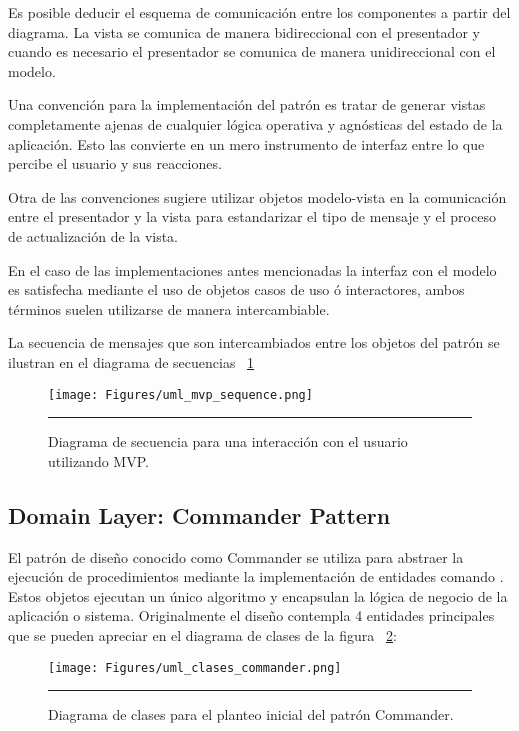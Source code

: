 Es posible deducir el esquema de comunicación entre los componentes a partir del diagrama. La vista se comunica de manera bidireccional con el presentador y cuando es necesario el presentador se comunica de manera unidireccional con el modelo.


Una convención para la implementación del patrón es tratar de generar vistas completamente ajenas de cualquier lógica operativa y agnósticas del estado de la aplicación. Esto las convierte en un mero instrumento de interfaz entre lo que percibe el usuario y sus reacciones. 

Otra de las convenciones sugiere utilizar objetos modelo-vista en la comunicación entre el presentador y la vista para estandarizar el tipo de mensaje y el proceso de actualización de la vista.

En el caso de las implementaciones antes mencionadas la interfaz con el modelo es satisfecha mediante el uso de objetos casos de uso ó interactores, ambos términos suelen utilizarse de manera intercambiable.

La secuencia de mensajes que son intercambiados entre los objetos del patrón se ilustran en el diagrama de secuencias ~\ref{fig:uml_mvp_sequence}

\begin{figure}[htbp]
	\centering
	\texttt{[image: Figures/uml\_mvp\_sequence.png]}
	\rule{35em}{1pt}
	\caption[MVP Sequence]{Diagrama de secuencia para una interacción con el usuario utilizando MVP.}
	\label{fig:uml_mvp_sequence}
\end{figure}

\subsection{Domain Layer: Commander Pattern}
El patrón de diseño conocido como Commander se utiliza para abstraer la ejecución de procedimientos mediante la implementación de entidades comando \cite{comm_sugrue}. Estos objetos ejecutan un único algoritmo y encapsulan la lógica de negocio de la aplicación o sistema.
Originalmente el diseño contempla 4 entidades principales que se pueden apreciar en el diagrama de clases de la figura ~\ref{fig:uml_clases_commander}:

\begin{figure}[htbp]
	\centering
	\texttt{[image: Figures/uml\_clases\_commander.png]}
	\rule{35em}{1pt}
	\caption[Commander Classes]{Diagrama de clases para el planteo inicial del patrón Commander.}
	\label{fig:uml_clases_commander}
\end{figure}

